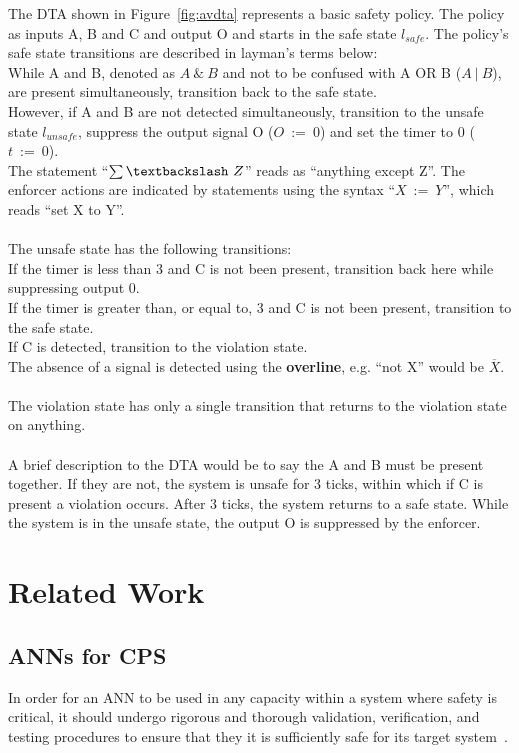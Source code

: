 \begin{example}\label{ex:dta}
	The \ac{DTA} shown in Figure~\ref{fig:avdta} represents a basic safety policy.
	The policy as inputs A, B and C and output O and starts in the safe state $l_{safe}$.
	The policy's safe state transitions are described in layman's terms below: \\
	While A and B, denoted as $A~\&~B$ and not to be confused with A OR B ($A~|~B$), are present simultaneously, transition back to the safe state.\\
	However, if A and B are not detected simultaneously, transition to the unsafe state $l_{unsafe}$, suppress the output signal O ($O~:=~0$) and set the timer to 0 ($t~:=~0$).\\
	The statement ``$\sum\textbackslash~Z$'' reads as ``anything except Z''.
	The enforcer actions are indicated by statements using the syntax ``$X~:=~Y$'', which reads ``set X to Y''.\\
	\\
	The unsafe state has the following transitions:\\
	If the timer is less than 3 and C is not been present, transition back here while suppressing output 0.\\
	If the timer is greater than, or equal to, 3 and C is not been present, transition to the safe state.\\
	If C is detected, transition to the violation state.\\
	The absence of a signal is detected using the \textbf{overline}, e.g. ``not X'' would be $\overline{X}$.\\
	\\
	The violation state has only a single transition that returns to the violation state on anything.\\
	\\
	A brief description to the \ac{DTA} would be to say the A and B must be present together. 
	If they are not, the system is unsafe for 3 ticks, within which if C is present a violation occurs.
	After 3 ticks, the system returns to a safe state.
	While the system is in the unsafe state, the output O is suppressed by the enforcer.
\end{example}

\section{Related Work}
\subsection{\acfp{ANN} for \acf{CPS}}
In order for an \ac{ANN} to be used in any capacity within a system where safety is critical, it should undergo rigorous and thorough validation, verification, and testing procedures to ensure that they it is sufficiently safe for its target system~\cite{scann, ANNSafetyLifecycle2003}. 

